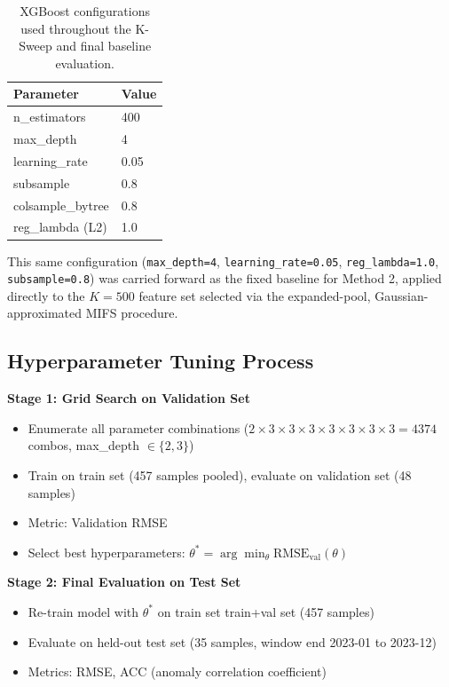 \begin{table}[H]
\centering
\caption{XGBoost configurations used throughout the K-Sweep and final baseline evaluation.}
\label{tab:xgb_baseline_config}
\normalsize
\renewcommand{\arraystretch}{1.2}
\begin{tabular}{|l|l|}
\hline
\textbf{Parameter} & \textbf{Value} \\
\hline
n\_estimators & 400 \\
\hline
max\_depth & 4 \\
\hline
learning\_rate & 0.05 \\
\hline
subsample & 0.8 \\
\hline
colsample\_bytree & 0.8 \\
\hline
reg\_lambda (L2) & 1.0 \\
\hline
\end{tabular}
\end{table}

This same configuration (\texttt{max\_depth=4}, \texttt{learning\_rate=0.05}, \texttt{reg\_lambda=1.0}, \texttt{subsample=0.8}) was carried forward as the fixed baseline for Method 2, applied directly to the $K=500$ feature set selected via the expanded-pool, Gaussian-approximated MIFS procedure.

\newpage
\subsection{Hyperparameter Tuning Process}

\textbf{Stage 1: Grid Search on Validation Set}
\begin{itemize}
\item Enumerate all parameter combinations ($2 \times 3 \times 3 \times 3 \times 3 \times 3 \times 3 \times 3 = 4374$ combos, max\_depth $\in \{2, 3\}$)
\item Train on train set (457 samples pooled), evaluate on validation set (48 samples)
\item Metric: Validation RMSE
\item Select best hyperparameters: $\theta^* = \arg\min_\theta \text{RMSE}_{\text{val}}(\theta)$
\end{itemize}

\textbf{Stage 2: Final Evaluation on Test Set}
\begin{itemize}
\item Re-train model with $\theta^*$ on train set train+val set (457 samples)
\item Evaluate on held-out test set (35 samples, window end 2023-01 to 2023-12)
\item Metrics: RMSE, ACC (anomaly correlation coefficient)
\end{itemize}

